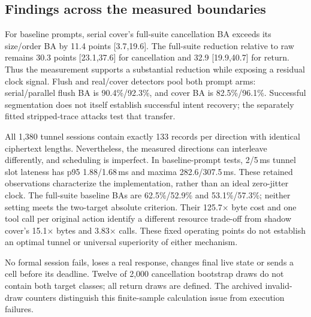 \subsection{Findings across the measured boundaries}
For baseline prompts, serial cover's full-suite cancellation BA exceeds its size/order BA by 11.4 points [3.7,19.6]. The full-suite reduction relative to raw remains 30.3 points [23.1,37.6] for cancellation and 32.9 [19.9,40.7] for return. Thus the measurement supports a substantial reduction while exposing a residual clock signal. Flush and real/cover detectors pool both prompt arms: serial/parallel flush BA is 90.4\%/92.3\%, and cover BA is 82.5\%/96.1\%. Successful segmentation does not itself establish successful intent recovery; the separately fitted stripped-trace attacks test that transfer.

All 1,380 tunnel sessions contain exactly 133 records per direction with identical ciphertext lengths. Nevertheless, the measured directions can interleave differently, and scheduling is imperfect. In baseline-prompt tests, 2/5\,ms tunnel slot lateness has p95 1.88/1.68\,ms and maxima 282.6/307.5\,ms. These retained observations characterize the implementation, rather than an ideal zero-jitter clock. The full-suite baseline BAs are 62.5\%/52.9\% and 53.1\%/57.3\%; neither setting meets the two-target absolute criterion. Their 125.7$\times$ byte cost and one tool call per original action identify a different resource trade-off from shadow cover's 15.1$\times$ bytes and 3.83$\times$ calls. These fixed operating points do not establish an optimal tunnel or universal superiority of either mechanism.

No formal session fails, loses a real response, changes final live state or sends a cell before its deadline. Twelve of 2,000 cancellation bootstrap draws do not contain both target classes; all return draws are defined. The archived invalid-draw counters distinguish this finite-sample calculation issue from execution failures.

\clearpage

